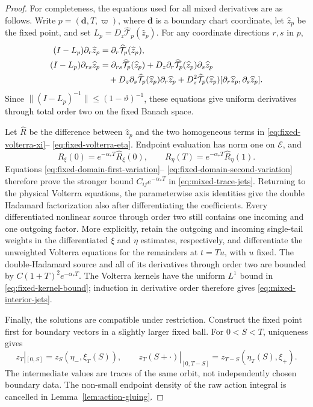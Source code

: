 \documentclass[11pt]{amsart}
\numberwithin{equation}{section}
\theoremstyle{definition}
\theoremstyle{remark}
\begin{document}
\begin{proof}
For completeness, the equations used for all mixed derivatives are as
follows.  Write $p=(\mathbf d,T,\varpi)$, where $\mathbf d$ is a boundary
chart coordinate, let $\widehat z_p$ be the fixed point, and set
$L_p=D_z\widehat{\mathcal T}_p(\widehat z_p)$.  For any coordinate
directions $r,s$ in $p$,
\begin{align}
 (I-L_p)\partial_r\widehat z_p
  &=\partial_r\widehat{\mathcal T}_p(\widehat z_p),
    \label{eq:fixed-domain-first-variation}\\
 (I-L_p)\partial_{rs}\widehat z_p
  &=\partial_{rs}\widehat{\mathcal T}_p(\widehat z_p)
   +D_z\partial_r\widehat{\mathcal T}_p(\widehat z_p)
      \partial_s\widehat z_p\notag\\
  &\quad+D_z\partial_s\widehat{\mathcal T}_p(\widehat z_p)
      \partial_r\widehat z_p
   +D_z^2\widehat{\mathcal T}_p(\widehat z_p)
      [\partial_r\widehat z_p,\partial_s\widehat z_p].
    \label{eq:fixed-domain-second-variation}
\end{align}
Since $\|(I-L_p)^{-1}\|\le(1-\vartheta)^{-1}$, these equations give
uniform derivatives through total order two on the fixed Banach space.

Let $\widehat R$ be the difference between $\widehat z_p$ and the two
homogeneous terms in \eqref{eq:fixed-volterra-xi}--
\eqref{eq:fixed-volterra-eta}.  Endpoint evaluation has norm one on
$\mathcal E$, and
\[
 R_\xi(0)=e^{-\alpha_*T}\widehat R_\xi(0),\qquad
 R_\eta(T)=e^{-\alpha_*T}\widehat R_\eta(1).
\]
Equations \eqref{eq:fixed-domain-first-variation}--
\eqref{eq:fixed-domain-second-variation} therefore prove the stronger
bound $C_{ij}e^{-\alpha_*T}$ in \eqref{eq:mixed-trace-jets}.  Returning to
the physical Volterra equations, the parameterwise axis identities give
the double Hadamard factorization also after differentiating the
coefficients.  Every differentiated nonlinear source through order two
still contains one incoming and one outgoing factor.  More explicitly,
retain the outgoing and incoming single-tail weights in the differentiated
$\xi$ and $\eta$ estimates, respectively, and differentiate the unweighted
Volterra equations for the remainders at $t=Tu$, with $u$ fixed.  The
double-Hadamard source and all of its derivatives through order two are
bounded by $C(1+T)^2e^{-\alpha_*T}$.  The Volterra kernels have the uniform
$L^1$ bound in \eqref{eq:fixed-kernel-bound}; induction in derivative order
therefore gives \eqref{eq:mixed-interior-jets}.

Finally, the solutions are compatible under restriction.  Construct the
fixed point first for boundary vectors in a slightly larger fixed ball.
For $0<S<T$, uniqueness gives
\begin{equation}\label{eq:passage-restriction}
 z_T|_{[0,S]}=z_S(\eta_-,\xi_T(S)),\qquad
 z_T(S+\cdot)|_{[0,T-S]}=z_{T-S}(\eta_T(S),\xi_+).
\end{equation}
The intermediate values are traces of the same orbit, not independently
chosen boundary data.  The non-small endpoint density of the raw action
integral is cancelled in Lemma~\ref{lem:action-gluing}.
\end{proof}
\end{document}
